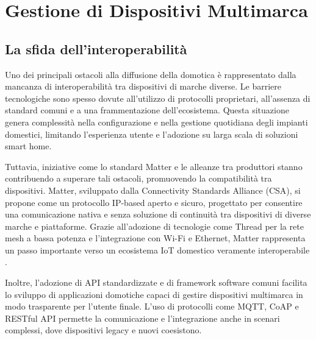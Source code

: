 \chapter{Gestione di Dispositivi Multimarca}
\section{La sfida dell'interoperabilità}
Uno dei principali ostacoli alla diffusione della domotica è rappresentato dalla mancanza di interoperabilità tra dispositivi di marche diverse. Le barriere tecnologiche sono spesso dovute all'utilizzo di protocolli proprietari, all'assenza di standard comuni e a una frammentazione dell'ecosistema. Questa situazione genera complessità nella configurazione e nella gestione quotidiana degli impianti domestici, limitando l’esperienza utente e l’adozione su larga scala di soluzioni smart home.

Tuttavia, iniziative come lo standard Matter e le alleanze tra produttori stanno contribuendo a superare tali ostacoli, promuovendo la compatibilità tra dispositivi. Matter, sviluppato dalla Connectivity Standards Alliance (CSA), si propone come un protocollo IP-based aperto e sicuro, progettato per consentire una comunicazione nativa e senza soluzione di continuità tra dispositivi di diverse marche e piattaforme. Grazie all’adozione di tecnologie come Thread per la rete mesh a bassa potenza e l’integrazione con Wi-Fi e Ethernet, Matter rappresenta un passo importante verso un ecosistema IoT domestico veramente interoperabile \cite{ConnectivityStandardsAlliance2023}.

Inoltre, l’adozione di API standardizzate e di framework software comuni facilita lo sviluppo di applicazioni domotiche capaci di gestire dispositivi multimarca in modo trasparente per l’utente finale. L’uso di protocolli come MQTT, CoAP e RESTful API permette la comunicazione e l’integrazione anche in scenari complessi, dove dispositivi legacy e nuovi coesistono.

